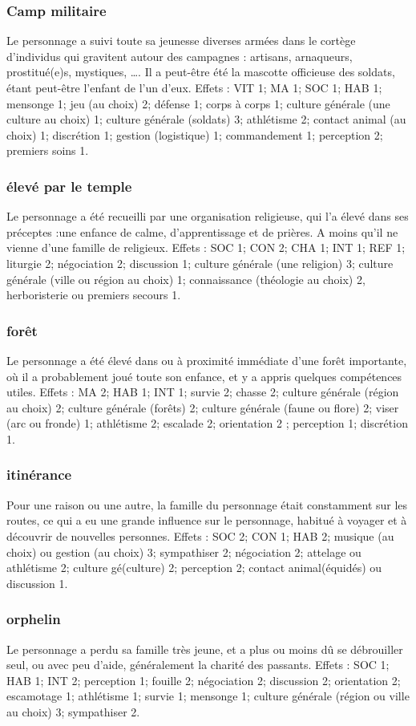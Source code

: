 \documentclass[10pt,a4paper,twocolumn]{book}
\begin{document}
\subsubsection{Camp militaire}
Le personnage a suivi toute sa jeunesse diverses armées dans le cortège d’individus qui gravitent autour des campagnes : artisans, arnaqueurs, prostitué(e)s, mystiques, …. Il a peut-être été la mascotte officieuse des soldats, étant peut-être l’enfant de l’un d’eux.
Effets : VIT 1; MA 1; SOC 1; HAB 1; mensonge 1; jeu (au choix) 2; défense 1; corps à corps 1; culture générale (une culture au choix) 1; culture générale (soldats) 3;  athlétisme 2; contact animal (au choix) 1; discrétion 1; gestion (logistique) 1; commandement 1; perception 2; premiers soins 1.
\subsubsection{élevé par le temple}
Le personnage a été recueilli par une organisation religieuse, qui l’a élevé dans ses préceptes :une enfance de calme, d’apprentissage et de prières. A moins qu’il ne vienne d’une famille de religieux.
Effets : SOC 1; CON 2; CHA 1; INT 1; REF 1; liturgie 2; négociation 2; discussion 1; culture générale (une religion) 3; culture générale (ville ou région au choix) 1; connaissance (théologie au choix) 2, herboristerie ou premiers secours 1.
\subsubsection{forêt}
Le personnage a été élevé dans ou à proximité immédiate d’une forêt importante, où il a probablement joué toute son enfance, et y a appris quelques compétences utiles.
Effets  : MA 2; HAB 1; INT 1; survie 2; chasse 2; culture générale (région au choix) 2; culture générale (forêts) 2; culture générale (faune ou flore) 2; viser (arc ou fronde) 1; athlétisme 2; escalade 2; orientation 2 ; perception 1; discrétion 1.
\subsubsection{itinérance}
Pour une raison ou une autre, la famille du personnage était constamment sur les routes, ce qui a eu une grande influence sur le personnage, habitué à voyager et à découvrir de nouvelles personnes.
Effets : SOC 2; CON 1; HAB 2; musique (au choix) ou gestion (au choix) 3; sympathiser 2; négociation 2; attelage ou athlétisme 2; culture gé(culture) 2; perception 2; contact animal(équidés) ou discussion 1.
\subsubsection{orphelin}
Le personnage a perdu sa famille très jeune, et a plus ou moins dû se débrouiller seul, ou avec peu d’aide, généralement la charité des passants.
Effets : SOC 1; HAB 1; INT 2; perception 1; fouille 2; négociation 2; discussion 2; orientation 2; escamotage 1; athlétisme 1; survie 1; mensonge 1; culture générale (région ou ville au choix) 3; sympathiser 2.
\end{document}
